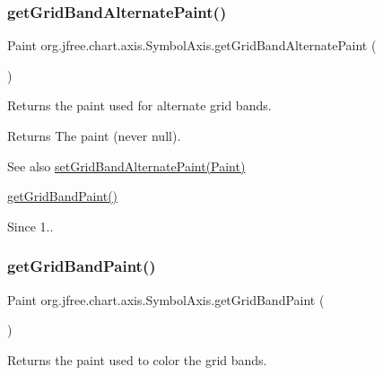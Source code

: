 \subsubsection{\texorpdfstring{get\+Grid\+Band\+Alternate\+Paint()}{getGridBandAlternatePaint()}}
{\footnotesize\ttfamily Paint org.\+jfree.\+chart.\+axis.\+Symbol\+Axis.\+get\+Grid\+Band\+Alternate\+Paint (\begin{DoxyParamCaption}{ }\end{DoxyParamCaption})}

Returns the paint used for alternate grid bands.

\begin{DoxyReturn}{Returns}
The paint (never {\ttfamily null}).
\end{DoxyReturn}
\begin{DoxySeeAlso}{See also}
\mbox{\hyperlink{classorg_1_1jfree_1_1chart_1_1axis_1_1_symbol_axis_a96e22d7f20188af44d5fcd5b1de1d204}{set\+Grid\+Band\+Alternate\+Paint(\+Paint)}} 

\mbox{\hyperlink{classorg_1_1jfree_1_1chart_1_1axis_1_1_symbol_axis_a180cbfcf9840f685400f6658e4fc29dc}{get\+Grid\+Band\+Paint()}}
\end{DoxySeeAlso}
\begin{DoxySince}{Since}
1.. 
\end{DoxySince}
\mbox{\label{classorg_1_1jfree_1_1chart_1_1axis_1_1_symbol_axis_a180cbfcf9840f685400f6658e4fc29dc}} 
\subsubsection{\texorpdfstring{get\+Grid\+Band\+Paint()}{getGridBandPaint()}}
{\footnotesize\ttfamily Paint org.\+jfree.\+chart.\+axis.\+Symbol\+Axis.\+get\+Grid\+Band\+Paint (\begin{DoxyParamCaption}{ }\end{DoxyParamCaption})}

Returns the paint used to color the grid bands.

